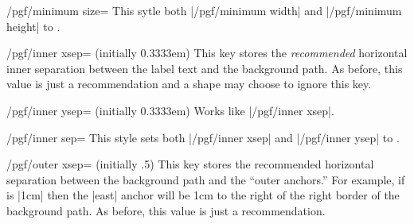 \begin{key}{/pgf/minimum size=}
  This sytle both |/pgf/minimum width| and |/pgf/minimum height| to .
\end{key}


\begin{key}{/pgf/inner xsep= (initially 0.3333em)}
  This key stores the \emph{recommended} horizontal
  inner separation between the label text and the background path. As
  before, this value is just a recommendation and a shape may choose
  to ignore this key.
  
\begin{codeexample}[]
\end{codeexample}
\end{key}

\begin{key}{/pgf/inner ysep= (initially 0.3333em)}
  Works like |/pgf/inner xsep|.
\end{key}

\begin{key}{/pgf/inner sep=}
  This style sets both |/pgf/inner xsep| and |/pgf/inner ysep| to .
\end{key}



\begin{key}{/pgf/outer xsep= (initially .5\string\pgflinewidth)}
  This key stores the recommended horizontal separation between the
  background path and the ``outer anchors.'' For example, if
   is |1cm| then the |east| anchor will be 1cm to the
  right of the right border of the background path. 
  As before, this value is just a recommendation.
  
\begin{codeexample}[]
\end{codeexample}
\end{key}

